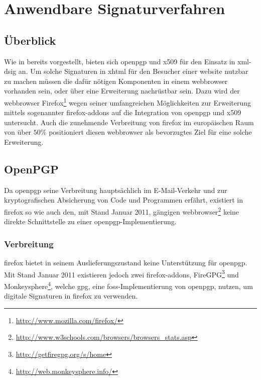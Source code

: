 
\chapter{Anwendbare Signaturverfahren}
\label{chap:Signaturverfahren}

\section{Überblick}
Wie in  bereits vorgestellt, bieten sich \gls{openpgp} und \gls{x509} für den Einsatz in
\gls{xml-dsig} an. Um solche Signaturen in \gls{xhtml} für den Besucher einer \gls{website} nutzbar zu machen müssen die dafür nötigen Komponenten in einem
\gls{webbrowser} vorhanden sein, oder über eine Erweiterung nachrüstbar sein. Dazu wird der \gls{webbrowser}
Firefox\footnote{\url{http://www.mozilla.com/firefox/}} wegen seiner umfangreichen Möglichkeiten zur Erweiterung mittels sogenannter
\glspl{firefox-addon} auf die Integration von \gls{openpgp} und \gls{x509} untersucht. Auch die zunehmende Verbreitung von \gls{firefox} im europäischen Raum
von über $50\%$ \cite{firefox-verbreitung} positioniert diesen \gls{webbrowser} als bevorzugtes Ziel für eine solche Erweiterung.

\section{OpenPGP}
\label{sec:Signaturverfahren:OpenPGP}
Da \gls{openpgp} seine Verbreitung hauptsächlich im E-Mail-Verkehr und zur kryptografischen Absicherung von Code und Programmen erfährt, existiert in
\gls{firefox} so wie auch den, mit Stand Januar 2011, gängigen \gls{webbrowser}\footnote{\url{http://www.w3schools.com/browsers/browsers_stats.asp}} keine direkte
Schnittstelle zu einer \gls{openpgp}-Implementierung.

\subsection{Verbreitung}
\gls{firefox} bietet in seinem Auslieferungszustand keine Unterstützung für \gls{openpgp}. Mit Stand Januar 2011 existieren jedoch zwei \glspl{firefox-addon},
FireGPG\footnote{\url{http://getfiregpg.org/s/home}} und
Monkeysphere\footnote{\url{http://web.monkeysphere.info/}}, welche \gls{gpg}, eine \gls{foss}-Implementierung von \gls{openpgp},
nutzen, um digitale Signaturen in \gls{firefox} zu verwenden.


